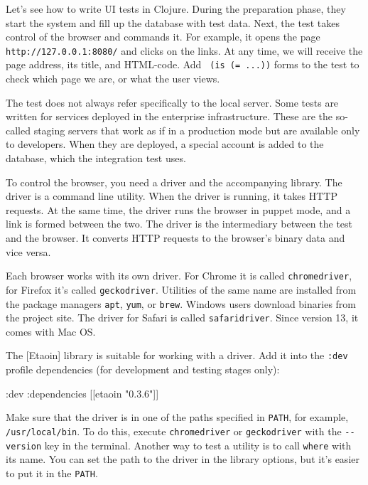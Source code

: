 Let's see how to write UI tests in Clojure. During the preparation phase, they start the system and fill up the database with test data. Next, the test takes control of the browser and commands it. For example, it opens the page \verb|http://127.0.0.1:8080/| and clicks on the links. At any time, we will receive the page address, its title, and HTML-code. Add \verb| (is (= ...))| forms to the test to check which page we are, or what the user views.

The test does not always refer specifically to the local server. Some tests are written for services deployed in the enterprise infrastructure. These are the so-called staging servers that work as if in a production mode but are available only to developers. When they are deployed, a special account is added to the database, which the integration test uses.

To control the browser, you need a driver and the accompanying library. The driver is a command line utility. When the driver is running, it takes HTTP requests. At the same time, the driver runs the browser in puppet mode, and a link is formed between the two. The driver is the intermediary between the test and the browser. It converts HTTP requests to the browser's binary data and vice versa.


Each browser works with its own driver. For Chrome it is called \verb|chromedriver|, for Firefox it's called \verb|geckodriver|. Utilities of the same name are installed from the package managers \verb|apt|, \verb|yum|, or \verb|brew|. Windows users download binaries from the project site. The driver for Safari is called \verb|safaridriver|. Since version 13, it comes with Mac OS.


The [Etaoin] library is suitable for working with a driver. Add it into the \verb|:dev| profile dependencies (for development and testing stages only):

\begin{english}
  \begin{clojure}
:dev {:dependencies [[etaoin "0.3.6"]]}
  \end{clojure}
\end{english}

Make sure that the driver is in one of the paths specified in \verb|PATH|, for example, \verb|/usr/local/bin|. To do this, execute \texttt{chrome\-driver} or \verb|geckodriver| with the \verb|--version| key in the terminal. Another way to test a utility is to call \verb|where| with its name. You can set the path to the driver in the library options, but it's easier to put it in the \verb|PATH|.


